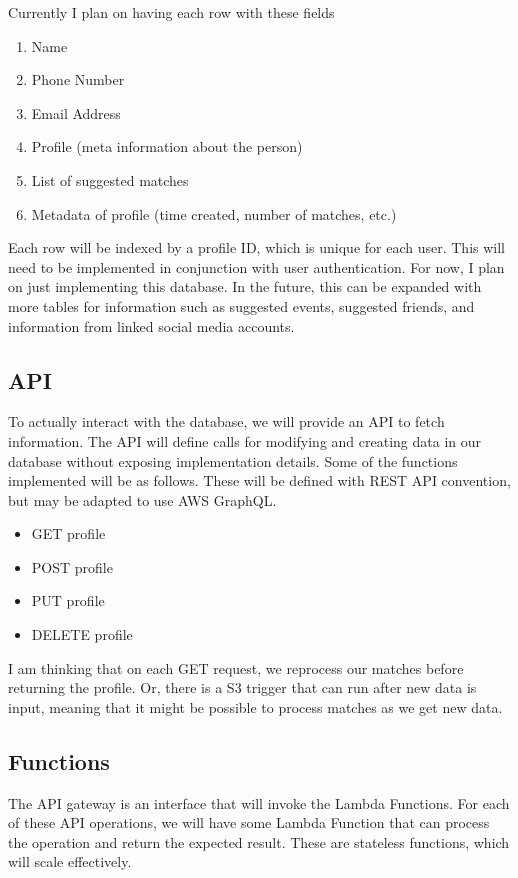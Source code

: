 \documentclass[12pt]{article}
\def\ind{\hspace*{0.3in}}
\begin{document}
Currently I plan on having each row with these fields 
\begin{enumerate}
    \item Name
    \item Phone Number
    \item Email Address
    \item Profile (meta information about the person)
    \item List of suggested matches
    \item Metadata of profile (time created, number of matches, etc.)
\end{enumerate}

Each row will be indexed by a profile ID, which is unique for each user. This will need to be implemented in conjunction with user authentication.
For now, I plan on just implementing this database. In the future, this can be expanded with more tables for information such as suggested events, suggested friends, and information from linked social media accounts.

\subsection*{API}

\ind To actually interact with the database, we will provide an API to fetch information. The API will define calls for modifying and creating data in our database without exposing implementation details. Some of the functions implemented will be as follows. These will be defined with REST API convention, but may be adapted to use AWS GraphQL.

\begin{itemize}
    \item GET profile
    \item POST profile
    \item PUT profile
    \item DELETE profile
\end{itemize}

I am thinking that on each GET request, we reprocess our matches before returning the profile. Or, there is a S3 trigger that can run after new data is input, meaning that it might be possible to process matches as we get new data. 

\subsection*{Functions}

\ind The API gateway is an interface that will invoke the Lambda Functions. For each of these API operations, we will have some Lambda Function that can process the operation and return the expected result. These are stateless functions, which will scale effectively.
\end{document}
